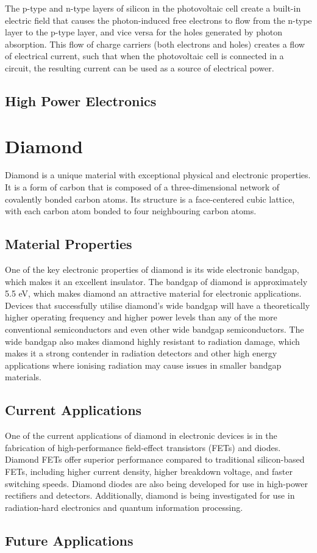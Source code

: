 The p-type and n-type layers of silicon in the photovoltaic cell create a built-in electric field that causes the photon-induced free electrons to flow from the n-type layer to the p-type layer, and vice versa for the holes generated by photon absorption. This flow of charge carriers (both electrons and holes) creates a flow of electrical current, such that when the photovoltaic cell is connected in a circuit, the resulting current can be used as a source of electrical power.
\subsection{High Power Electronics}

\section{Diamond}
Diamond is a unique material with exceptional physical and electronic properties. It is a form of carbon that is composed of a three-dimensional network of covalently bonded carbon atoms. Its structure is a face-centered cubic lattice, with each carbon atom bonded to four neighbouring carbon atoms.
\subsection{Material Properties}
One of the key electronic properties of diamond is its wide electronic bandgap, which makes it an excellent insulator. The bandgap of diamond is approximately 5.5 \si{\electronvolt}, which makes diamond an attractive material for electronic applications. Devices that successfully utilise diamond's wide bandgap will have a theoretically higher operating frequency and higher power levels than any of the more conventional semiconductors and even other wide bandgap semiconductors. The wide bandgap also makes diamond highly resistant to radiation damage, which makes it a strong contender in radiation detectors and other high energy applications where ionising radiation may cause issues in smaller bandgap materials.
\subsection{Current Applications}
One of the current applications of diamond in electronic devices is in the fabrication of high-performance field-effect transistors (FETs) and diodes. Diamond FETs offer superior performance compared to traditional silicon-based FETs, including higher current density, higher breakdown voltage, and faster switching speeds. Diamond diodes are also being developed for use in high-power rectifiers and detectors. Additionally, diamond is being investigated for use in radiation-hard electronics and quantum information processing.
\subsection{Future Applications}